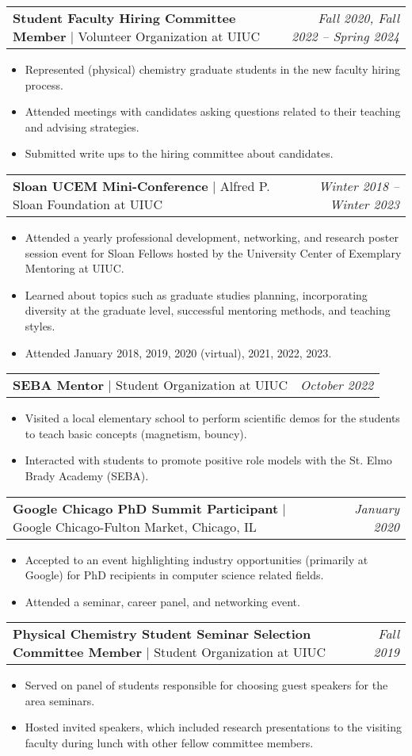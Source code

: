 \documentclass[letterpaper,10pt]{article}
\makeatletter
\newcommand{\experienceitemvspace}{3pt}
\newcommand{\resumeItem}[1]{
  \item{
    {#1 \vspace{-4pt}}
  }
}
\newcommand{\titleItem}[1]{
  \textbf{#1}
}
\newcommand{\resumeProjectHeading}[2]{
    \item
    \begin{tabular*}{0.97\textwidth}{l@{\extracolsep{\fill}}r}
      #1 & \textit{ #2} \\
    \end{tabular*}\vspace{-9pt}
}
\newcommand{\resumeItemListStart}{
\begin{itemize}}
\newcommand{\resumeItemListEnd}{
\end{itemize}\vspace{-8pt}}
\makeatother
\begin{document}
\vspace{\experienceitemvspace}
\resumeProjectHeading
{\titleItem{{Student Faculty Hiring Committee Member}} $|$ Volunteer Organization at UIUC}{\textcolor{color2}{Fall 2020, Fall 2022 -- Spring 2024}}
\vspace{2pt}
\resumeItemListStart
\resumeItem{Represented (physical) chemistry graduate students in the new faculty hiring process.}
\resumeItem{Attended meetings with candidates asking questions related to their teaching and advising strategies.}
\resumeItem{Submitted write ups to the hiring committee about candidates.}
\resumeItemListEnd

\vspace{\experienceitemvspace}
\resumeProjectHeading
{\titleItem{{Sloan UCEM Mini-Conference}} $|$ Alfred P. Sloan Foundation at UIUC}{\textcolor{color2}{Winter 2018 -- Winter 2023}}
\vspace{2pt}
\resumeItemListStart
\resumeItem{Attended a yearly professional development, networking, and research poster session event for Sloan Fellows hosted by the University Center of Exemplary Mentoring at UIUC.}
\resumeItem{Learned about topics such as graduate studies planning, incorporating diversity at the graduate level, successful mentoring methods, and teaching styles.}
\resumeItem{Attended January 2018, 2019, 2020 (virtual), 2021, 2022, 2023.}
\resumeItemListEnd

\vspace{\experienceitemvspace}
\resumeProjectHeading
{\titleItem{{SEBA Mentor}} $|$ Student Organization at UIUC}{\textcolor{color2}{October 2022}}
\vspace{2pt}
\resumeItemListStart
\resumeItem{Visited a local elementary school to perform scientific demos for the students to teach basic concepts (magnetism, bouncy).}
\resumeItem{Interacted with students to promote positive role models with the St. Elmo Brady Academy (SEBA).}
\resumeItemListEnd

\vspace{\experienceitemvspace}
\resumeProjectHeading
{\titleItem{{Google Chicago PhD Summit Participant}} $|$ Google Chicago-Fulton Market, Chicago, IL}{\textcolor{color2}{January 2020}}
\vspace{2pt}
\resumeItemListStart
\resumeItem{Accepted to an event highlighting industry opportunities (primarily at Google) for PhD recipients in computer science related fields.}
\resumeItem{Attended a seminar, career panel, and networking event.}
\resumeItemListEnd

\vspace{\experienceitemvspace}
\resumeProjectHeading
{\titleItem{{Physical Chemistry Student Seminar Selection Committee Member}} $|$ Student Organization at UIUC}{\textcolor{color2}{Fall 2019}}
\vspace{2pt}
\resumeItemListStart
\resumeItem{Served on panel of students responsible for choosing guest speakers for the area seminars.}
\resumeItem{Hosted invited speakers, which included research presentations to the visiting faculty during lunch with other fellow committee members.}
\resumeItemListEnd
\end{document}

